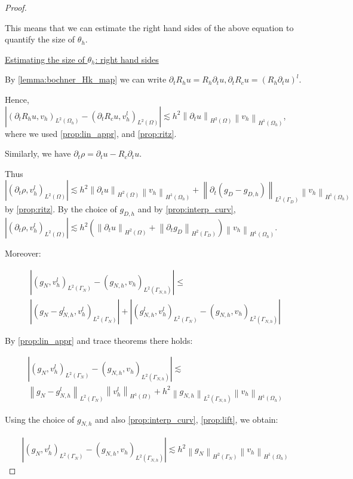 \documentclass[english,a4paper,10pt,oneside]{scrbook}	%
\theoremstyle{break}
\newenvironment{mproof}[1][\proofname]{%
  \begin{proof}[#1]$ $\par\nobreak\ignorespaces
}{%
  \end{proof}
}
\renewcommand*{\proofname}{Proof}
\theoremstyle{remark}
\newcommand{\norm}[1]{\left\lVert#1\right\rVert}
\begin{document}
\begin{mproof}
This means that we can estimate the right hand sides of the above equation to quantify the size of $\theta_h$.

\underline{Estimating the size of $\theta_h$: right hand sides}

By \cref{lemma:bochner_Hk_map} we can write $\partial_t R_h u = R_h \partial_t u, \partial_t R_c u = (R_h \partial_t u)^l$.

Hence, $|(\partial_t R_h u , v_h)_{L^2(\Omega_h)} - (\partial_t R_c u , v_h^l)_{L^2(\Omega)}|\lesssim h^2 \norm{\partial_t u}_{H^2(\Omega)}\norm{v_h}_{H^1(\Omega_h)}$, where we used \cref{prop:lin_appr}, and \cref{prop:ritz}.

Similarly, we have $\partial_t \rho = \partial_t u - R_c\partial_t u$.

Thus $| (\partial_t \rho, v_h^l)_{L^2(\Omega)}|\lesssim h^2 \norm{\partial_t u}_{H^2(\Omega)}\norm{v_h}_{H^1(\Omega_h)} + \norm{\partial_t(g_D - g_{D,h}) }_{L^2(\Gamma_D)}\norm{v_h}_{H^1(\Omega_h)}$ by \cref{prop:ritz}. By the choice of $g_{D,h}$ and by \cref{prop:interp_curv}, $| (\partial_t \rho, v_h^l)_{L^2(\Omega)}|\lesssim h^2 (\norm{\partial_t u}_{H^2(\Omega)} + \norm{\partial_t g_D}_{H^2(\Gamma_D)})\norm{v_h}_{H^1(\Omega_h)}$.

Moreover:

\begin{align*}
	|(g_{N}, v_h^l)_{L^2(\Gamma_{N})} - (g_{N,h}, v_h)_{L^2(\Gamma_{N,h})} |\leq\\
	|(g_{N} - g_{N,h}^l, v_h^l)_{L^2(\Gamma_{N})}| + |(g_{N,h}^l, v_h^l)_{L^2(\Gamma_{N})} - (g_{N,h}, v_h)_{L^2(\Gamma_{N,h})} |
\end{align*}

By \cref{prop:lin_appr} and trace theorems there holds:


\begin{align*}
	|(g_{N}, v_h^l)_{L^2(\Gamma_{N})} - (g_{N,h}, v_h)_{L^2(\Gamma_{N,h})} |\lesssim\\
	\norm{g_{N} - g_{N,h}^l}_{L^2(\Gamma_{N})}\norm{v_h^l}_{H^1(\Omega)} + h^2\norm{g_{N,h}}_{L^2(\Gamma_{N,h})} \norm{v_h}_{H^1(\Omega_h )}
\end{align*}

Using the choice of $g_{N,h}$ and also \cref{prop:interp_curv}, \cref{prop:lift}, we obtain:

\begin{align*}
	|(g_{N}, v_h^l)_{L^2(\Gamma_{N})} - (g_{N,h}, v_h)_{L^2(\Gamma_{N,h})} |\lesssim 	h^2 \norm{g_N}_{H^2(\Gamma_N)}\norm{v_h}_{H^1(\Omega_h)}
\end{align*}


\end{mproof}
\end{document}
